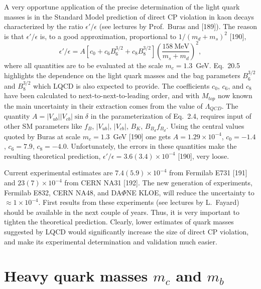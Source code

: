 A very opportune application of the precise determination of the light quark masses is in the Standard Model prediction of direct CP violation in kaon decays characterized by the ratio $\epsilon'/\epsilon$ (see lectures by Prof.~Buras and [189]). The reason is that $\epsilon'/\epsilon$ is, to a good approximation, proportional to $1/(m_d + m_s)^2$ [190],
\begin{equation}
\epsilon'/\epsilon = A \left[c_0 + c_6 B_6^{3/2} + c_8 B_8^{3/2}\right] \left(\frac{158~\mathrm{MeV}}{m_s + m_d}\right)^2,
\end{equation}
where all quantities are to be evaluated at the scale $m_c = 1.3$~GeV. Eq.~20.5 highlights the dependence on the light quark masses and the bag parameters $B_6^{3/2}$ and $B_8^{3/2}$ which LQCD is also expected to provide. The coefficients $c_0$, $c_6$, and $c_8$ have been calculated to next-to-next-to-leading order, and with $M_{top}$ now known the main uncertainty in their extraction comes from the value of $\Lambda_{QCD}$. The quantity $A = |V_{ub}||V_{cb}| \sin\delta$ in the parameterization of Eq.~2.4, requires input of other SM parameters like $f_B$, $|V_{ub}|$, $|V_{cb}|$, $B_K$, $B_{B_d} f_{B_d}$. Using the central values quoted by Buras at scale $m_c = 1.3$~GeV [190] one gets $A = 1.29 \times 10^{-4}$, $c_0 = -1.4$, $c_6 = 7.9$, $c_8 = -4.0$. Unfortunately, the errors in these quantities make the resulting theoretical prediction, $\epsilon'/\epsilon = 3.6(3.4) \times 10^{-4}$ [190], very loose.

Current experimental estimates are $7.4(5.9) \times 10^{-4}$ from Fermilab E731 [191] and $23(7) \times 10^{-4}$ from CERN NA31 [192]. The new generation of experiments, Fermilab E832, CERN NA48, and DA$\Phi$NE KLOE, will reduce the uncertainty to $\approx 1 \times 10^{-4}$. First results from these experiments (see lectures by L.~Fayard) should be available in the next couple of years. Thus, it is very important to tighten the theoretical prediction. Clearly, lower estimates of quark masses suggested by LQCD would significantly increase the size of direct CP violation, and make its experimental determination and validation much easier.

\section{Heavy quark masses $m_c$ and $m_b$}

